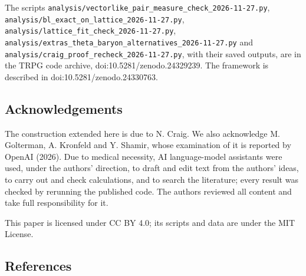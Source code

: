 \documentclass[
  11pt,
]{article}
\begin{document}
The scripts \texttt{analysis/vectorlike\_pair\_measure\_check\_2026-11-27.py}, \texttt{analysis/bl\_exact\_on\_lattice\_2026-11-27.py}, \texttt{analysis/lattice\_fit\_check\_2026-11-27.py}, \texttt{analysis/extras\_theta\_baryon\_alternatives\_2026-11-27.py} and \texttt{analysis/craig\_proof\_recheck\_2026-11-27.py}, with their saved outputs, are in the TRPG code archive, doi:10.5281/zenodo.24329239. The framework is described in doi:10.5281/zenodo.24330763.

\hypertarget{acknowledgements}{%
\subsection{Acknowledgements}\label{acknowledgements}}

The construction extended here is due to N. Craig. We also acknowledge M. Golterman, A. Kronfeld and Y. Shamir, whose examination of it is reported by OpenAI (2026). Due to medical necessity, AI language-model assistants were used, under the authors' direction, to draft and edit text from the authors' ideas, to carry out and check calculations, and to search the literature; every result was checked by rerunning the published code. The authors reviewed all content and take full responsibility for it.

This paper is licensed under CC BY 4.0; its scripts and data are under the MIT License.

\hypertarget{references}{%
\subsection{References}\label{references}}
\end{document}
